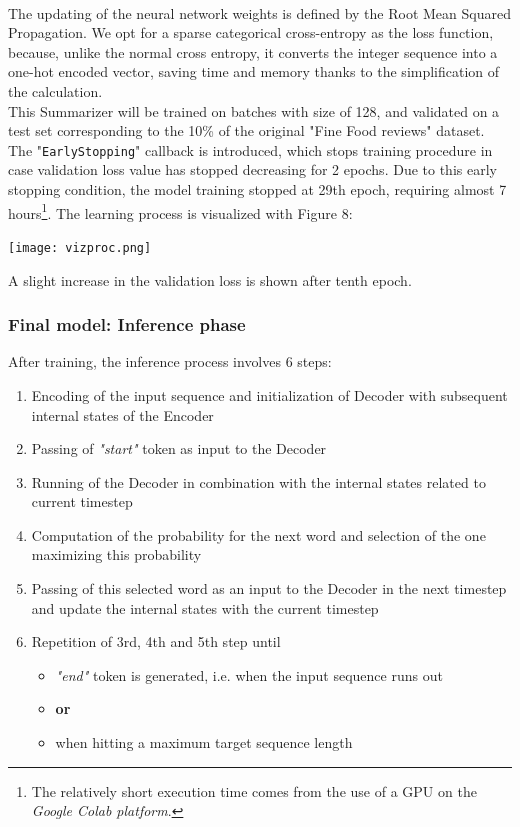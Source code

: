 \documentclass[fleqn,10pt]{SelfArx} %
\begin{document}
\\
The updating of the neural network weights is defined by the Root Mean Squared Propagation. We opt for a sparse categorical cross-entropy as the loss function, because, unlike the normal cross entropy, it converts the integer sequence into a one-hot encoded vector, saving time and memory thanks to the simplification of the calculation.\\
This Summarizer will be trained on batches with size of 128, and validated on a test set corresponding to the 10\% of the original "Fine Food reviews" dataset.\\
The "\texttt{EarlyStopping}" callback is introduced, which stops training procedure in case validation loss value has stopped decreasing for 2 epochs. Due to this early stopping condition, the model training stopped at 29th epoch, requiring almost 7 hours\footnote{The relatively short execution time comes from the use of a GPU on the \textit{Google Colab platform}.}. The learning process is visualized with Figure 8:
\par
{\centering\vspace{10pt}
\texttt{[image: vizproc.png]}
\vspace{10pt}
\par}
A slight increase in the validation loss is shown after tenth epoch.
\subsubsection{Final model: Inference phase}
After training, the inference process involves 6 steps:
\begin{enumerate}
    \item Encoding of the input sequence and initialization of Decoder with subsequent internal states of the Encoder
    \item Passing of \textit{"start"} token as input to the Decoder
    \item Running of the Decoder in combination with the internal states related to current timestep 
    \item Computation of the probability for the next word and selection of the one maximizing this probability
    \item Passing of this selected word as an input to the Decoder in the next timestep and update the internal states with the current timestep
    \item Repetition of 3rd, 4th and 5th step until
    \begin{itemize}
        \item \textit{"end"} token is generated, i.e. when the input sequence runs out
        \item[] \textbf{or}
        \item when hitting a maximum target sequence length 
    \end{itemize}
\end{enumerate}
\end{document}
